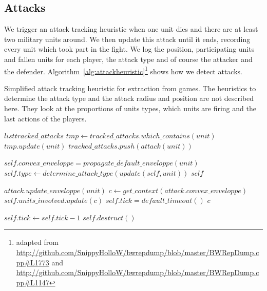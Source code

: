 \subsection{Attacks}
We trigger an attack tracking heuristic when one unit dies and there are at least two military units around. We then update this attack until it ends, recording every unit which took part in the fight. We log the position, participating units and fallen units for each player, the attack type and of course the attacker and the defender. Algorithm~\ref{alg:attackheuristic}\footnote{adapted from \url{http://github.com/SnippyHolloW/bwrepdump/blob/master/BWRepDump.cpp\#L1773} and \url{http://github.com/SnippyHolloW/bwrepdump/blob/master/BWRepDump.cpp\#L1147}} shows how we detect attacks.
\begin{algorithm}
\caption{Simplified attack tracking heuristic for extraction from games. The heuristics to determine the attack type and the attack radius and position are not described here. They look at the proportions of units types, which units are firing and the last actions of the players.}
\label{alg:attackheuristic}
\begin{algorithmic}
\State $list tracked\_attacks$
    \State $tmp \leftarrow tracked\_attacks.which\_contains(unit)$
        \State $tmp.update(unit)$ 
    \Else
        \State $tracked\_attacks.push(attack(unit))$
    \EndIf
\EndFunction

 
    \State $self.convex\_enveloppe = propagate\_default\_enveloppe(unit)$ 
    \State $ $ 
    \State $self.type \leftarrow determine\_attack\_type(update(self, unit))$
    \State \Return $self$
\EndFunction

    \State $attack.update\_enveloppe(unit)$ 
    \State $c \leftarrow get\_context(attack.convex\_enveloppe)$
    \State $self.units\_involved.update(c)$ 
    \State $self.tick = default\_timeout()$
    \State \Return $c$
\EndFunction

    \State $self.tick \leftarrow self.tick - 1$
        \State $self.destruct()$
    \EndIf
\EndFunction
\end{algorithmic}
\end{algorithm}


